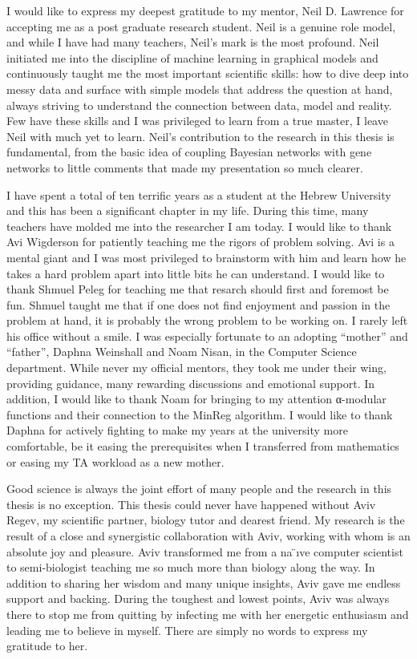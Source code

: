 
\begin{acknowledgements}      


I would like to express my deepest gratitude to my mentor, Neil D. Lawrence for accepting me as a post graduate research student. Neil is a genuine role model, and while I have had many teachers, Neil’s mark is the most profound. Neil initiated me into the discipline of machine learning in graphical models and continuously taught me the most important scientific skills: how to dive deep into messy data and surface with simple models that address the question at hand, always striving to understand the connection between data, model and reality. Few have these skills and I was privileged to learn from a true master, I leave Neil with much yet to learn. Neil’s contribution to the research in this thesis is fundamental, from the basic idea of coupling Bayesian networks with gene networks to little comments that made my presentation so much clearer.

I have spent a total of ten terrific years as a student at the Hebrew University and this has been a significant chapter in my life. During this time, many teachers have molded me into the researcher I am today. I would like to thank Avi Wigderson for patiently teaching me the rigors of problem solving. Avi is a mental giant and I was most privileged to brainstorm with him and learn how he takes a hard problem apart into little bits he can understand. I would like to thank Shmuel Peleg for teaching me that resarch should first and foremost be fun. Shmuel taught me that if one does not find enjoyment and passion in the problem at hand, it is probably the wrong problem to be working on. I rarely left his office without a smile. I was especially fortunate to an adopting “mother” and “father”, Daphna Weinshall and Noam Nisan, in the Computer Science department. While never my official mentors, they took me under their wing, providing guidance, many rewarding discussions and emotional support. In addition, I would like to thank Noam for bringing to my attention α-modular functions and their connection to the MinReg algorithm. I would like to thank Daphna for actively fighting to make my years at the university more comfortable, be it easing the prerequisites when I transferred from mathematics or easing my TA workload as a new mother. 

Good science is always the joint effort of many people and the research in this thesis is no exception. This thesis could never have happened without Aviv Regev, my scientific partner, biology tutor and dearest friend. My research is the result of a close and synergistic collaboration with Aviv, working with whom is an absolute joy and pleasure. Aviv transformed me from a na ̈ıve computer scientist to semi-biologist teaching me so much more than biology along the way. In addition to sharing her wisdom and many unique insights, Aviv gave me endless support and backing. During the toughest and lowest points, Aviv was always there to stop me from quitting by infecting me with her energetic enthusiasm and leading me to believe in myself. There are simply no words to express my gratitude to her.


\end{acknowledgements}
